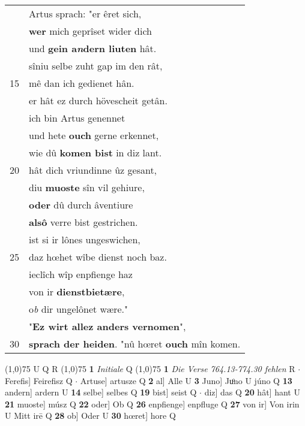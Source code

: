 \documentclass[8pt,a4paper,notitlepage]{article}
\begin{document}
\begin{table}[ht]
\begin{minipage}[t]{0.5\linewidth}
\begin{tabular}{rl}
 & Artus sprach: "er êret sich,\\ 
 & \textbf{wer} mich geprîset wider dich\\ 
 & und \textbf{gein a\textit{n}dern liuten} hât.\\ 
 & sîniu selbe zuht gap im den rât,\\ 
15 & mê dan ich gedienet hân.\\ 
 & er hât ez durch hövescheit getân.\\ 
 & ich bin Artus genennet\\ 
 & und hete \textbf{ouch} gerne erkennet,\\ 
 & wie dû \textbf{komen bist} in diz lant.\\ 
20 & hât dich vriundinne ûz gesant,\\ 
 & diu \textbf{muoste} sîn vil gehiure,\\ 
 & \textbf{oder} dû durch âventiure\\ 
 & \textbf{alsô} verre bist gestrichen.\\ 
 & ist si ir lônes ungeswichen,\\ 
25 & daz hœhet wîbe dienst noch baz.\\ 
 & ieclîch wîp enpfienge haz\\ 
 & von ir \textbf{dienstbietære},\\ 
 & o\textit{b} dir ungelônet wære."\\ 
 & "\textbf{Ez wirt allez anders vernomen}",\\ 
30 & \textbf{sprach der heiden}. "nû hœret \textbf{ouch} mîn komen.\\ 
\end{tabular}
\scriptsize
\line(1,0){75} \newline
U Q R \newline
\line(1,0){75} \newline
\textbf{1} \textit{Initiale} Q  \newline
\line(1,0){75} \newline
\textbf{1} \textit{Die Verse 764.13-774.30 fehlen} R   $\cdot$ Ferefis] Feirefisz Q  $\cdot$ Artuse] artusze Q \textbf{2} al] Alle U \textbf{3} Juno] Juͦno U júno Q \textbf{13} andern] ardern U \textbf{14} selbe] selbes Q \textbf{19} bist] seist Q  $\cdot$ diz] das Q \textbf{20} hât] hant U \textbf{21} muoste] músz Q \textbf{22} oder] Ob Q \textbf{26} enpfienge] enpfluge Q \textbf{27} von ir] Von irin U Mitt irē Q \textbf{28} ob] Oder U \textbf{30} hœret] hore Q \newline
\end{minipage}
\end{table}
\end{document}
